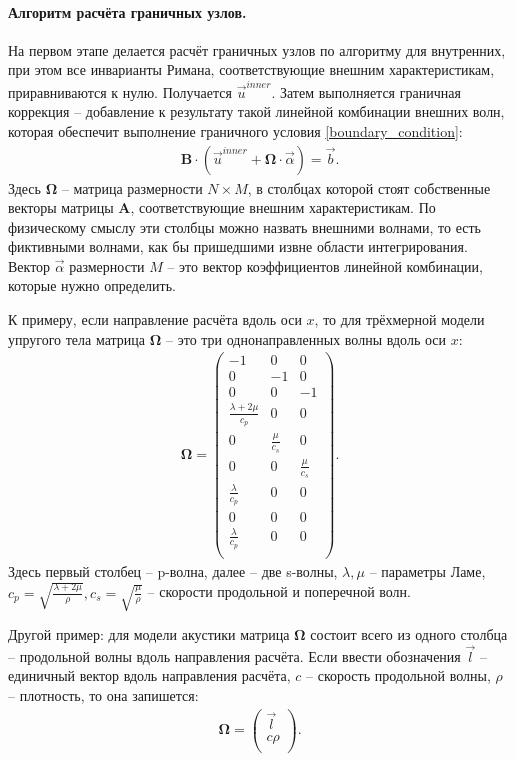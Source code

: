 \documentclass[a4paper]{article}
\numberwithin{equation}{section}
\begin{document}
\paragraph{Алгоритм расчёта граничных узлов.}
\label{sec:good-border-case}
На первом этапе делается расчёт граничных узлов по алгоритму для внутренних, 
при этом все инварианты Римана, соответствующие внешним характеристикам, приравниваются к нулю. 
Получается $\vec{u}^{inner}$. Затем выполняется граничная коррекция -- 
добавление к результату такой линейной комбинации внешних волн, 
которая обеспечит выполнение граничного условия \eqref{boundary_condition}:
\begin{eqnarray}
	\mathbf{B} \cdot (\vec{u}^{inner} + \mathbf{\Omega} \cdot \vec{\alpha}) = \vec{b}.
\end{eqnarray}
Здесь $\mathbf{\Omega}$ -- матрица размерности $N \times M$, 
в столбцах которой стоят собственные векторы 
матрицы $\mathbf{A}$, соответствующие внешним характеристикам.
По физическому смыслу эти столбцы можно назвать внешними волнами,
то есть фиктивными волнами, как бы пришедшими извне области интегрирования.
Вектор $\vec{\alpha}$ размерности $M$ -- это вектор
коэффициентов линейной комбинации, которые нужно определить.

К примеру, если направление расчёта вдоль оси $x$, то 
для трёхмерной модели упругого тела матрица $\mathbf{\Omega}$ -- 
это три однонаправленных волны вдоль оси $x$:
\begin{align}
\label{Omega_for_elastic3D}
	\mathbf{\Omega} =
	\left( \begin{array}{cccccccccccc}
	-1 & 0  &  0 \\
	 0 & -1 &  0 \\
	 0 &  0 & -1 \\
	\frac{\lambda+2\mu}{c_p} & 0 & 0 \\
	0 & \frac{\mu}{c_s} & 0 \\
	0 & 0 & \frac{\mu}{c_s} \\
	\frac{\lambda}{c_p} & 0 & 0 \\
	0 & 0 & 0 \\
	\frac{\lambda}{c_p} & 0 & 0 \\
	\end{array} \right).
\end{align} 
Здесь первый столбец -- p-волна, далее -- две s-волны, 
$\lambda, \mu$ -- параметры Ламе, 
$c_p = \sqrt{\frac{\lambda + 2\mu}{\rho}}, c_s = \sqrt{\frac{\mu}{\rho}}$ -- 
скорости продольной и поперечной волн.

Другой пример: для модели акустики матрица $\mathbf{\Omega}$ состоит 
всего из одного столбца -- продольной волны вдоль направления расчёта. 
Если ввести обозначения $\vec{l}$ -- единичный вектор вдоль направления расчёта,
$c$ -- скорость продольной волны, $\rho$ -- плотность, то она запишется:
\begin{align}
\label{Omega_for_acoustic}
	\mathbf{\Omega} =
	\left( \begin{array}{cccccccccccc}
	 \vec{l} \\
	 c \rho \\
	\end{array} \right).
\end{align} 
\end{document}
